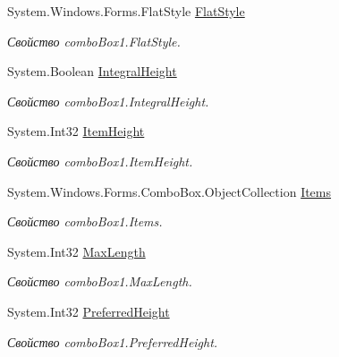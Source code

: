 \begin{DoxyCompactItemize}
System.\+Windows.\+Forms.\+Flat\+Style \mbox{\hyperlink{class_f_b_a_1_1_sys_d_b_edit_a570b940f70c506b1f6e7b600eb78b5fb}{Flat\+Style}}
\begin{DoxyCompactList}\small\item\em Свойство combo\+Box1.\+Flat\+Style. \end{DoxyCompactList}\item 
System.\+Boolean \mbox{\hyperlink{class_f_b_a_1_1_sys_d_b_edit_acd81e2f3e6d047df18d76f2aa1792b4e}{Integral\+Height}}
\begin{DoxyCompactList}\small\item\em Свойство combo\+Box1.\+Integral\+Height. \end{DoxyCompactList}\item 
System.\+Int32 \mbox{\hyperlink{class_f_b_a_1_1_sys_d_b_edit_a4dd9a7601be6d85f6f699c550743426e}{Item\+Height}}
\begin{DoxyCompactList}\small\item\em Свойство combo\+Box1.\+Item\+Height. \end{DoxyCompactList}\item 
System.\+Windows.\+Forms.\+Combo\+Box.\+Object\+Collection \mbox{\hyperlink{class_f_b_a_1_1_sys_d_b_edit_a2794d9711cc031f592158b0fa5d5ad2a}{Items}}
\begin{DoxyCompactList}\small\item\em Свойство combo\+Box1.\+Items. \end{DoxyCompactList}\item 
System.\+Int32 \mbox{\hyperlink{class_f_b_a_1_1_sys_d_b_edit_af9f9d6c06b3aaf62ed388016db3c7853}{Max\+Length}}
\begin{DoxyCompactList}\small\item\em Свойство combo\+Box1.\+Max\+Length. \end{DoxyCompactList}\item 
System.\+Int32 \mbox{\hyperlink{class_f_b_a_1_1_sys_d_b_edit_ad6a30a192aeb877d24faf47a9ec8c7ec}{Preferred\+Height}}
\begin{DoxyCompactList}\small\item\em Свойство combo\+Box1.\+Preferred\+Height. \end{DoxyCompactList}\item 

\end{DoxyCompactItemize}
